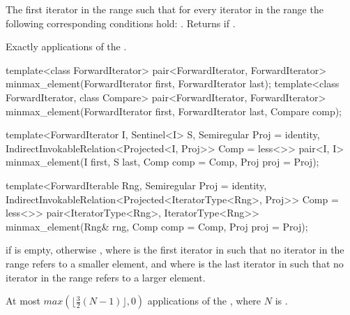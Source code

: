\begin{itemdescr}
\pnum
\returns
The first iterator
in the range
such that for every iterator
in the range
the following corresponding conditions hold:
.
Returns
if
.

\pnum
\complexity
Exactly
applications of the .
\end{itemdescr}

%
\begin{removedblock}
\begin{itemdecl}
template<class ForwardIterator>
  pair<ForwardIterator, ForwardIterator>
    minmax_element(ForwardIterator first, ForwardIterator last);
template<class ForwardIterator, class Compare>
  pair<ForwardIterator, ForwardIterator>
    minmax_element(ForwardIterator first, ForwardIterator last, Compare comp);
\end{itemdecl}
\end{removedblock}
\begin{addedblock}
\begin{itemdecl}
template<ForwardIterator I, Sentinel<I> S, Semiregular Proj = identity,
    IndirectInvokableRelation<Projected<I, Proj>> Comp = less<>>
  pair<I, I>
    minmax_element(I first, S last, Comp comp = Comp{}, Proj proj = Proj{});

template<ForwardIterable Rng, Semiregular Proj = identity,
    IndirectInvokableRelation<Projected<IteratorType<Rng>, Proj>> Comp = less<>>
  pair<IteratorType<Rng>, IteratorType<Rng>>
    minmax_element(Rng& rng, Comp comp = Comp{}, Proj proj = Proj{});
\end{itemdecl}
\end{addedblock}

\begin{itemdescr}
\pnum
\returns
{} if  is empty, otherwise
, where  is
the first iterator in  such that no iterator in the range refers to a smaller
element, and where  is the last iterator in  such that no iterator
in the range refers to a larger element.

\pnum
\complexity
At most
$max(\lfloor{\frac{3}{2}} (N-1)\rfloor, 0)$
applications of the ,
where $N$ is .
\end{itemdescr}

